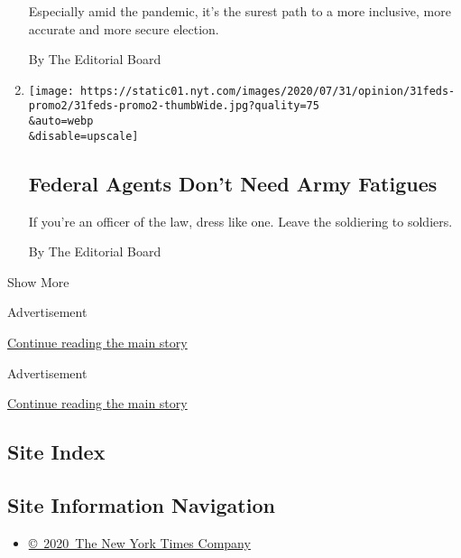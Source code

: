 \begin{enumerate}
  Especially amid the pandemic, it's the surest path to a more
  inclusive, more accurate and more secure election.

  By The Editorial Board
\item
  \href{/2020/07/31/opinion/federal-agents-trump-uniforms.html}{}

  \texttt{[image: https://static01.nyt.com/images/2020/07/31/opinion/31feds-promo2/31feds-promo2-thumbWide.jpg?quality=75\\\&auto=webp\\\&disable=upscale]}

  \hypertarget{federal-agents-dont-need-army-fatigues}{%
  \subsection{Federal Agents Don't Need Army
  Fatigues}\label{federal-agents-dont-need-army-fatigues}}

  If you're an officer of the law, dress like one. Leave the soldiering
  to soldiers.

  By The Editorial Board
\end{enumerate}

Show More

Advertisement

\protect\hyperlink{after-mid1}{Continue reading the main story}

Advertisement

\protect\hyperlink{after-mktg}{Continue reading the main story}

\hypertarget{site-index}{%
\subsection{Site Index}\label{site-index}}

\hypertarget{site-information-navigation}{%
\subsection{Site Information
Navigation}\label{site-information-navigation}}

\begin{itemize}
\tightlist
\item
  \href{https://help.nytimes.com/hc/en-us/articles/115014792127-Copyright-notice}{©~2020~The
  New York Times Company}
\end{itemize}

